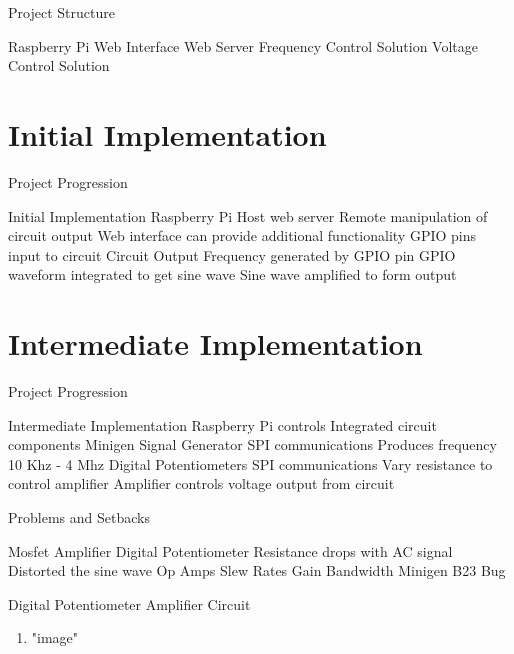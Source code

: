 \begin{frame}{Project Structure}
  \begin{enumerate}
    Raspberry Pi
    Web Interface
    Web Server
    Frequency Control Solution
    Voltage Control Solution
  \end{enumerate}
\end{frame}

\section{Initial Implementation}

\begin{frame}{Project Progression}
  \begin{enumerate}
    Initial Implementation
    Raspberry Pi 
    Host web server
    Remote manipulation of circuit output
    Web interface can provide additional functionality
    GPIO pins input to circuit
    Circuit Output
    Frequency generated by GPIO pin 
    GPIO waveform integrated to get sine wave
    Sine wave amplified to form output
  \end{enumerate}
\end{frame}

\section{Intermediate Implementation}

\begin{frame}{Project Progression}
  \begin{enumerate}
    Intermediate Implementation
    Raspberry Pi controls Integrated circuit components
    Minigen Signal Generator
    SPI communications
    Produces frequency 10 Khz - 4 Mhz
    Digital Potentiometers
    SPI communications
    Vary resistance to control amplifier
    Amplifier controls voltage output from circuit
  \end{enumerate}
\end{frame}

\begin{frame}{Problems and Setbacks}
  \begin{enumerate}
    Mosfet Amplifier
    Digital Potentiometer
    Resistance drops with AC signal
    Distorted the sine wave
    Op Amps
    Slew Rates
    Gain Bandwidth
    Minigen
    B23 Bug
  \end{enumerate}
\end{frame}

\begin{frame}{Digital Potentiometer Amplifier Circuit }
  \begin{enumerate}
    \item "image"
  \end{enumerate}
\end{frame}

